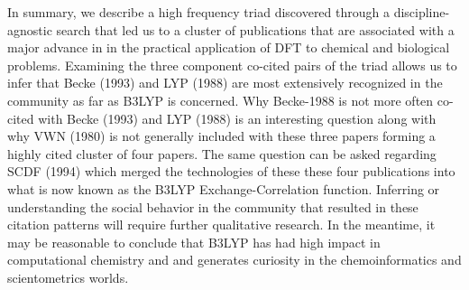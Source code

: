 \documentclass[journal=jcdis8,manuscript=article]{achemso}
\begin{document}
In summary, we describe a high frequency triad discovered through a discipline-agnostic search that led us to a cluster of publications that are associated with a major advance in  in the practical application of DFT to chemical and biological problems. Examining the three component co-cited pairs of the triad allows us to infer that Becke (1993) and LYP (1988) are most extensively recognized in the community as far as B3LYP is concerned. Why Becke-1988 is not more often co-cited with Becke (1993) and LYP (1988) is an interesting question along with why VWN (1980) is not generally included with these three papers forming a highly cited cluster of four papers. The same question can be asked regarding SCDF (1994) which merged the technologies of these these four publications into what is now known as the B3LYP Exchange-Correlation function.  Inferring or understanding the social behavior in the community that resulted in these citation patterns will require further qualitative research. In the meantime, it may be reasonable to conclude that B3LYP has had high impact in computational chemistry and and generates curiosity in the chemoinformatics  and scientometrics worlds.

%

\end{document}
